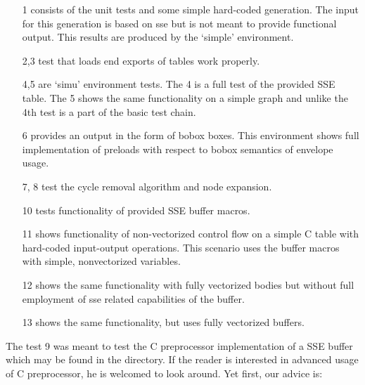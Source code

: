 \begin{enumerate}
  \item[1] consists of the unit tests and some simple hard-coded generation. The input for this generation is based on sse but is not meant to provide functional output. This results are produced by the `simple' environment.
  \item[2,3] test that loads end exports of tables work properly.
  \item[4,5] are `simu' environment tests. The 4 is a full test of the provided SSE table. The 5 shows the same functionality on a simple graph and unlike the 4th test is a part of the basic test chain.
  \item[6] provides an output in the form of bobox boxes. This environment shows full implementation of preloads with respect to bobox semantics of envelope usage.
  \item[7, 8] test the cycle removal algorithm and node expansion.
  \item[10] tests functionality of provided SSE buffer macros.
  \item[11] shows functionality of non-vectorized control flow on a simple C table with hard-coded input-output operations. This scenario uses the buffer macros with simple, nonvectorized variables.
  \item[12] shows the same functionality with fully vectorized bodies but without full employment of sse related capabilities of the buffer.
  \item[13] shows the same functionality, but uses fully vectorized buffers.
\end{enumerate}

The test 9 was meant to test the C preprocessor implementation of a SSE buffer which may be found in the  directory. If the reader is interested in advanced usage of C preprocessor, he is welcomed to look around. Yet first, our advice is:


